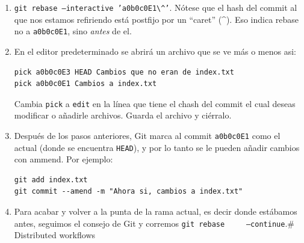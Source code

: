 \begin{enumerate}
\def\labelenumi{\arabic{enumi}.}
\item
  \passthrough{\lstinline!git rebase –interactive ’a0b0c0E1\^’!}. Nótese
  que el hash del commit al que nos estamos refiriendo está postfijo por
  un ``caret'' (\^{}). Eso indica rebase no a
  \passthrough{\lstinline!a0b0c0E1!}, sino \emph{antes} de el.
\item
  En el editor predeterminado se abrirá un archivo que se ve más o menos
  asi:

\begin{lstlisting}
pick a0b0c0E3 HEAD Cambios que no eran de index.txt
pick a0b0c0E1 Cambios a index.txt
\end{lstlisting}

  Cambia \passthrough{\lstinline!pick!} a \passthrough{\lstinline!edit!}
  en la línea que tiene el chash del commit el cual deseas modificar o
  añadirle archivos. Guarda el archivo y ciérralo.
\item
  Después de los pasos anteriores, Git marca al commit
  \passthrough{\lstinline!a0b0c0E1!} como el actual (donde se encuentra
  \passthrough{\lstinline!HEAD!}), y por lo tanto se le pueden añadir
  cambios con ammend. Por ejemplo:

\begin{lstlisting}
git add index.txt
git commit --amend -m "Ahora si, cambios a index.txt"
\end{lstlisting}
\item
  Para acabar y volver a la punta de la rama actual, es decir donde
  estábamos antes, seguimos el consejo de Git y corremos
  \passthrough{\lstinline!git rebase     –continue!}.\# Distributed
  workflows
\end{enumerate}
